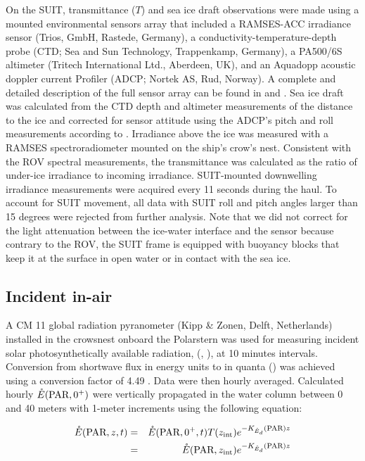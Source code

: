 On the SUIT, transmittance ($T$) and sea ice draft observations were made using a mounted environmental sensors array that included a RAMSES-ACC irradiance sensor (Trios, GmbH, Rastede, Germany), a conductivity-temperature-depth probe (CTD; Sea and Sun Technology, Trappenkamp, Germany), a PA500/6S altimeter (Tritech International Ltd., Aberdeen, UK), and an Aquadopp acoustic doppler current Profiler (ADCP; Nortek AS, Rud, Norway). A complete and detailed description of the full sensor array can be found in \citet{David2015} and \citet{Lange2016}. Sea ice draft was calculated from the CTD depth and altimeter measurements of the distance to the ice and corrected for sensor attitude using the ADCP's pitch and roll measurements according to \citet{Lange2016}. Irradiance above the ice was measured with a RAMSES spectroradiometer mounted on the ship's crow's nest. Consistent with the ROV spectral measurements, the transmittance was calculated as the ratio of under-ice irradiance to incoming irradiance. SUIT-mounted downwelling irradiance measurements were acquired every 11 seconds during the haul. To account for SUIT movement, all data with SUIT roll and pitch angles larger than 15 degrees were rejected from further analysis. Note that we did not correct for the light attenuation between the ice-water interface and the sensor because contrary to the ROV, the SUIT frame is equipped with buoyancy blocks  that keep it at the surface in open water or in contact with the sea ice. 

\subsection{Incident in-air \eparscalar{}}

A CM 11 global radiation pyranometer (Kipp \& Zonen, Delft, Netherlands) installed in the crowsnest onboard the Polarstern was used for measuring incident solar photosynthetically available radiation, (\eparscalar{}, \wmsquare), at 10 minutes intervals. Conversion from shortwave flux in energy units to \eparscalar{} in quanta (\micromol{}) was achieved using a conversion factor of 4.49 \citep{McCree1972}. Data were then hourly averaged. Calculated hourly $\mathring{E}(\textnormal{PAR}, 0^+)$ were vertically propagated in the water column between 0 and 40 meters with 1-meter increments using the following equation:

\begin{linenomath*}
    \begin{eqnarray}
        \mathring{E}(\textnormal{PAR}, z, t) & = & \mathring{E}(\textnormal{PAR}, 0^+, t){}T(z_{\textnormal{int}})e^{-K_{\mathring{E}_d}(\textnormal{PAR}){}z} \\
        & = & \mathring{E}(\textnormal{PAR}, z_\textnormal{int})e^{-K_{\mathring{E}_d}(\textnormal{PAR}){}z} \nonumber
    \end{eqnarray}
\end{linenomath*}

